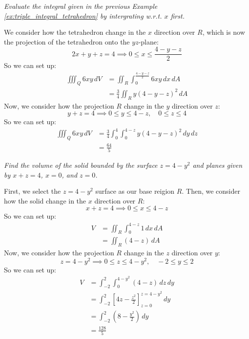 \documentclass[11pt]{report}
\begin{document}
\begin{example}
    \textit{Evaluate the integral given in the previous Example \ref{ex:triple_integral_tetrahedron} by intergrating w.r.t. $x$ first.}

    We consider how the tetrahedron change in the $x$ direction over $R$, which is now the projection of the 
    tetrahedron onto the $yz$-plane:
    $$
        2x + y + z = 4 \implies 0 \le x \le \frac{4 - y - z}{2}
    $$
    So we can set up:
    \begin{align*}
        \iiint_Q 6xy \, dV &= \iint_R \int_0^{\frac{4 - y - z}{2}} 6xy \, dx \, dA \\
        &= \frac{3}{4}\iint_R y(4 - y - z)^2 \, dA
    \end{align*}
    Now, we consider how the projection $R$ change in the $y$ direction over $z$:
    $$
        y + z = 4 \implies 0 \le y \le 4 - z, \quad 0 \le z \le 4
    $$
    So we can set up:
    \begin{align*}
        \iiint_Q 6xy \, dV &= \frac{3}{4} \int_0^4 \int_0^{4 - z} y(4 - y - z)^2 \, dy \, dz \\
        &= \frac{64}{5}
    \end{align*}
\end{example}

\begin{example}
    \textit{Find the volume of the solid bounded by the surface $z = 4 - y^2$ and planes given by $x+z = 4$, $x=0$, and $z=0$.}

    First, we select the $z = 4 - y^2$ surface as our base reigion $R$. Then, we consider how the solid change in the $x$ direction over $R$:
    $$
        x + z = 4 \implies 0 \le x \le 4 - z
    $$
    So we can set up:
    \begin{align*}
        V &= \iint_R \int_0^{4 - z} 1 \, dx \, dA \\
        &= \iint_R (4 - z) \, dA
    \end{align*}
    Now, we consider how the projection $R$ change in the $z$ direction over $y$:
    $$        z = 4 - y^2 \implies 0 \le z \le 4 - y^2, \quad -2 \le y \le 2
    $$
    So we can set up:
    \begin{align*}
        V &= \int_{-2}^2 \int_0^{4 - y^2} (4 - z) \, dz \, dy \\
        &= \int_{-2}^2 \left[ 4z - \frac{z^2}{2} \right]_{z=0}^{z=4 - y^2} \, dy \\
        &= \int_{-2}^2 \left( 8 - \frac{y^2}{2} \right) \, dy \\
        &= \frac{128}{5}
    \end{align*}
\end{example}
\end{document}
